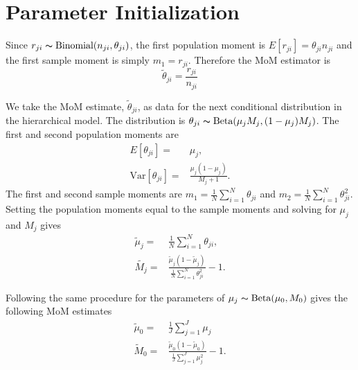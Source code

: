 \documentclass[11pt,reqno]{amsart}
\begin{document}
\appendix
\section{Parameter Initialization}\label{sec:appendix_mom}
Since $r_{ji} \thicksim \text{Binomial}(n_{ji}, \theta_{ji})$, the first population moment is  $E[r_{ji}] = \theta_{ji} n_{ji}$ and the first sample moment is simply $m_1 = r_{ji}$. Therefore the MoM estimator is 
\begin{equation}
	\tilde{\theta}_{ji} = \frac{r_{ji}} {n_{ji}}
\end{equation}

We take the MoM estimate, $\tilde{\theta}_{ji}$, as data for the next conditional distribution in the hierarchical model. The distribution is $\theta_{ji} \thicksim \text{Beta}(\mu_jM_j, (1-\mu_j)M_j)$. The first and second population moments are
\begin{eqnarray}
	E[\theta_{ji}] =& \mu_j,\\
	\text{Var}[\theta_{ji}] =& \frac{\mu_j(1-\mu_j)} { M_j + 1 }.
\end{eqnarray}
The first and second sample moments are $m_1 = \frac{1}{N}\sum_{i=1}^N \theta_{ji}$ and $m_2 = \frac{1}{N}\sum_{i=1}^N \theta_{ji}^2$. Setting the population moments equal to the sample moments and solving for $\mu_j$ and $M_j$ gives
\begin{eqnarray}
	\tilde{\mu}_j =& \frac{1}{N} \sum_{i=1}^N \theta_{ji}, \\
	\tilde{M_j} =& \frac{ \tilde{\mu}_j (1 - \tilde{\mu}_j ) } { \frac{1}{N} \sum_{i=1}^N \theta_{ji}^2 } -1.
\end{eqnarray}

Following the same procedure for the parameters of $\mu_j \thicksim \text{Beta}(\mu_0, M_0)$ gives the following MoM estimates
\begin{eqnarray}
	\tilde{\mu}_0 =& \frac{1}{J} \sum_{j=1}^J \mu_j \\
	\tilde{M}_0 =& \frac{ \tilde{\mu}_0 (1 - \tilde{\mu}_0 ) } {\frac{1}{J} \sum_{j=1}^J \mu_j^2 } -1.
\end{eqnarray}
\end{document}
